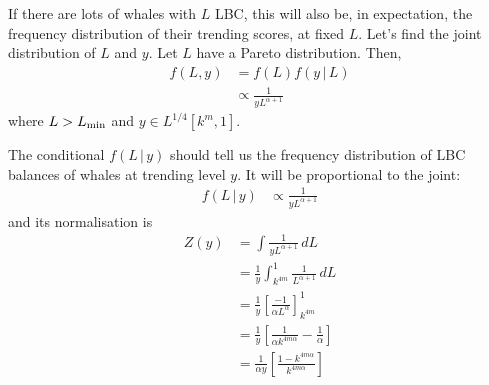 \documentclass[a4paper, 12pt]{article}
\newcommand{\given}{\,|\,}
\begin{document}
If there are lots of whales with $L$ LBC, this will also be, in expectation,
the frequency distribution of their trending scores, at fixed $L$.
Let's find the joint distribution of $L$ and $y$.
Let $L$ have a Pareto distribution. Then,
\begin{align}
f(L, y) &= f(L)f(y \given L) \\
        &\propto \frac{1}{yL^{\alpha + 1}}
\end{align}
where $L > L_{\rm min}$ and $y \in L^{1/4}[k^m, 1]$.

The conditional $f(L \given y)$ should tell us the
frequency distribution of LBC balances
of whales at trending level $y$. It will be proportional to
the joint:
\begin{align}
f(L \given y) &\propto \frac{1}{yL^{\alpha + 1}}
\end{align}
and its normalisation is
\begin{align}
Z(y) &= \int \frac{1}{yL^{\alpha + 1}} \, dL \\
     &= \frac{1}{y}\int_{k^{4m}}^{1} \frac{1}{L^{\alpha + 1}} \, dL \\
     &= \frac{1}{y}\left[\frac{-1}{\alpha L^\alpha}\right]_{k^{4m}}^{1} \\
     &= \frac{1}{y}\left[\frac{1}{\alpha k^{4m\alpha}} -
                           \frac{1}{\alpha} \right] \\
     &= \frac{1}{\alpha y}\left[\frac{1 - k^{4m\alpha}}{k^{4m\alpha}}\right] \\
\end{align}







\end{document}

